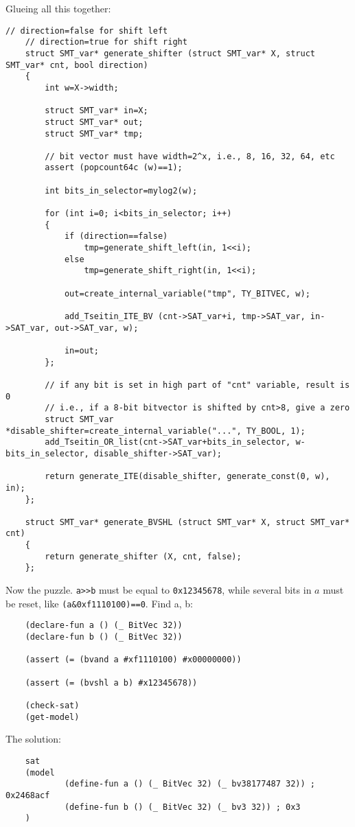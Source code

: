 Glueing all this together:

\begin{lstlisting}[style=customc]
	// direction=false for shift left
	// direction=true for shift right
	struct SMT_var* generate_shifter (struct SMT_var* X, struct SMT_var* cnt, bool direction)
	{
		int w=X->width;

		struct SMT_var* in=X;
		struct SMT_var* out;
		struct SMT_var* tmp;

		// bit vector must have width=2^x, i.e., 8, 16, 32, 64, etc
		assert (popcount64c (w)==1);

		int bits_in_selector=mylog2(w);

		for (int i=0; i<bits_in_selector; i++)
		{
			if (direction==false)
				tmp=generate_shift_left(in, 1<<i);
			else
				tmp=generate_shift_right(in, 1<<i);

			out=create_internal_variable("tmp", TY_BITVEC, w);

			add_Tseitin_ITE_BV (cnt->SAT_var+i, tmp->SAT_var, in->SAT_var, out->SAT_var, w);

			in=out;
		};

		// if any bit is set in high part of "cnt" variable, result is 0
		// i.e., if a 8-bit bitvector is shifted by cnt>8, give a zero
		struct SMT_var *disable_shifter=create_internal_variable("...", TY_BOOL, 1);
		add_Tseitin_OR_list(cnt->SAT_var+bits_in_selector, w-bits_in_selector, disable_shifter->SAT_var);

		return generate_ITE(disable_shifter, generate_const(0, w), in);
	};

	struct SMT_var* generate_BVSHL (struct SMT_var* X, struct SMT_var* cnt)
	{
		return generate_shifter (X, cnt, false);
	};
\end{lstlisting}

Now the puzzle.
\verb|a>>b| must be equal to \verb|0x12345678|, while several bits in $a$ must be reset, like \verb|(a&0xf1110100)==0|.  Find a, b:

\begin{lstlisting}
	(declare-fun a () (_ BitVec 32))
	(declare-fun b () (_ BitVec 32))

	(assert (= (bvand a #xf1110100) #x00000000))

	(assert (= (bvshl a b) #x12345678))

	(check-sat)
	(get-model)
\end{lstlisting}

The solution:

\begin{lstlisting}
	sat
	(model
	        (define-fun a () (_ BitVec 32) (_ bv38177487 32)) ; 0x2468acf
        	(define-fun b () (_ BitVec 32) (_ bv3 32)) ; 0x3
	)
\end{lstlisting}

